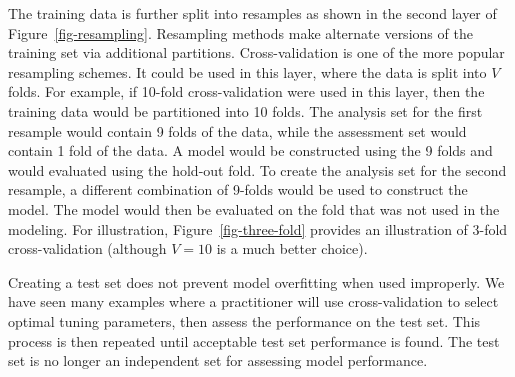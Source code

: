 \documentclass[
  letterpaper,
  DIV=11,
  numbers=noendperiod]{scrartcl}
\begin{document}
The training data is further split into resamples as shown in the second
layer of Figure~\ref{fig-resampling}. Resampling methods make alternate
versions of the training set via additional partitions. Cross-validation
is one of the more popular resampling schemes. It could be used in this
layer, where the data is split into \(V\) folds. For example, if 10-fold
cross-validation were used in this layer, then the training data would
be partitioned into 10 folds. The analysis set for the first resample
would contain 9 folds of the data, while the assessment set would
contain 1 fold of the data. A model would be constructed using the 9
folds and would evaluated using the hold-out fold. To create the
analysis set for the second resample, a different combination of 9-folds
would be used to construct the model. The model would then be evaluated
on the fold that was not used in the modeling. For illustration,
Figure~\ref{fig-three-fold} provides an illustration of 3-fold
cross-validation (although \(V = 10\) is a much better choice).

\begin{tcolorbox}[enhanced jigsaw, title=\textcolor{quarto-callout-important-color}{\faExclamation}\hspace{0.5em}{\textbf{WTF} \#6}, rightrule=.15mm, leftrule=.75mm, bottomtitle=1mm, opacityback=0, opacitybacktitle=0.6, bottomrule=.15mm, arc=.35mm, colframe=quarto-callout-important-color-frame, breakable, toprule=.15mm, toptitle=1mm, colback=white, titlerule=0mm, coltitle=black, left=2mm, colbacktitle=quarto-callout-important-color!10!white]

Creating a test set does not prevent model overfitting when used
improperly. We have seen many examples where a practitioner will use
cross-validation to select optimal tuning parameters, then assess the
performance on the test set. This process is then repeated until
acceptable test set performance is found. The test set is no longer an
independent set for assessing model performance.

\end{tcolorbox}
\end{document}
